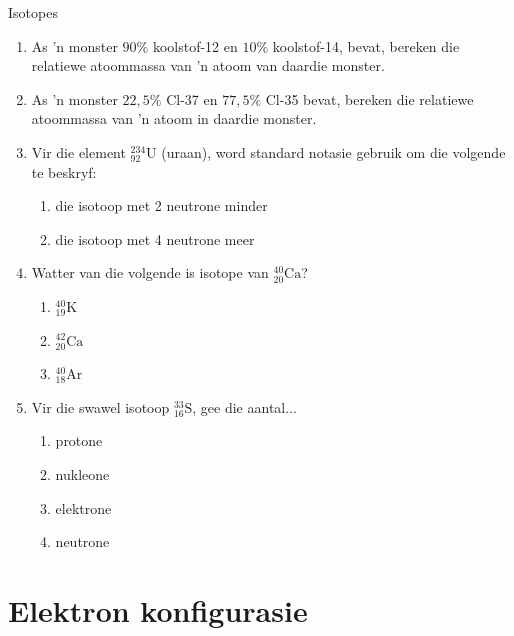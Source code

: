 \begin{exercises}{Isotopes}
{\begin{enumerate}[noitemsep, label=\textbf{\arabic*}. ]
\item As  'n monster $90\%$ koolstof-12 en $10\%$ koolstof-14, bevat, bereken die relatiewe atoommassa van  'n atoom van daardie monster.
\hspace{1ex}        

\item As  'n monster $22,5\%$ Cl-37 en $77,5\%$ Cl-35 bevat, bereken die relatiewe atoommassa van  'n atoom in daardie monster.

\item Vir die element $^{234}_{92}{\text{U}}$ (uraan), word standard notasie gebruik om die volgende te beskryf:
\begin{enumerate}[noitemsep, label=\textbf{\alph*}. ]
\item die isotoop met 2 neutrone minder
\item die isotoop met 4 neutrone meer
\end{enumerate}

\item Watter van die volgende is isotope van $^{40}_{20}\text{Ca}$?
\begin{enumerate}[noitemsep, label=\textbf{\alph*}. ]
\item $^{40}_{19}\text{K}$
\item $^{42}_{20}\text{Ca}$
\item $^{40}_{18}\text{Ar}$
\end{enumerate}

\item Vir die swawel isotoop $^{33}_{16}\text{S}$, gee die aantal...
\begin{enumerate}[noitemsep, label=\textbf{\alph*}. ]
\item{protone}
\item{nukleone}
\item{elektrone}
\item{neutrone}
\end{enumerate}
\hspace{1ex}        
\end{enumerate}

}
\end{exercises}

         \section{Elektron konfigurasie}

